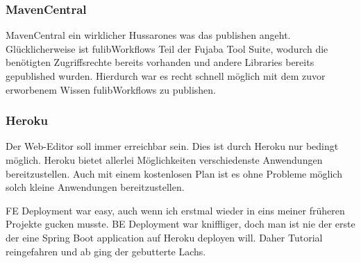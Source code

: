 \subsubsection{MavenCentral}\label{subsubsec:mavencentral}
MavenCentral ein wirklicher Hussarones was das publishen angeht.
Glücklicherweise ist fulibWorkflows Teil der Fujaba Tool Suite, wodurch die benötigten
Zugriffsrechte bereits vorhanden und andere Libraries bereits gepublished wurden.
Hierdurch war es recht schnell möglich mit dem zuvor erworbenem Wissen fulibWorkflows
zu publishen.

\subsubsection{Heroku}\label{subsubsec:heroku}
Der Web-Editor soll immer erreichbar sein.
Dies ist durch Heroku nur bedingt möglich.
Heroku bietet allerlei Möglichkeiten verschiedenste Anwendungen bereitzustellen.
Auch mit einem kostenlosen Plan ist es ohne Probleme möglich solch kleine Anwendungen bereitzustellen.

FE Deployment war easy, auch wenn ich erstmal wieder in eins meiner früheren Projekte gucken musste.
BE Deployment war kniffliger, doch man ist nie der erste der eine Spring Boot application
auf Heroku deployen will.
Daher Tutorial reingefahren und ab ging der gebutterte Lachs.